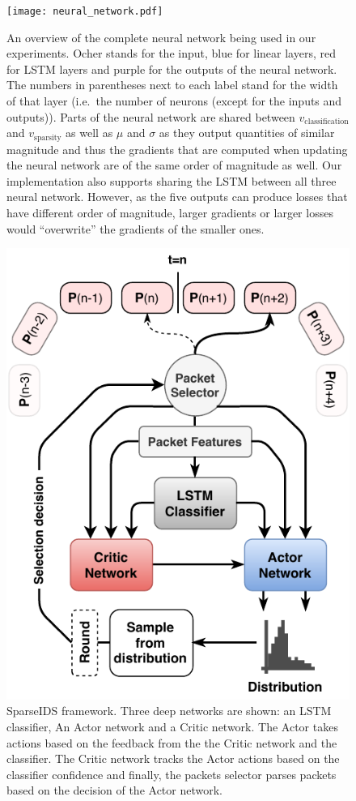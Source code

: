 \documentclass[conference]{IEEEtran}
\newcommand\note[2]{{\color{#1}#2}}
\begin{document}
\begin{figure}
\centering
  \texttt{[image: neural\_network.pdf]}
  \caption{An overview of the complete neural network being used in our experiments. Ocher stands for the input, blue for linear layers, red for LSTM layers and purple for the outputs of the neural network. The numbers in parentheses next to each label stand for the width of that layer (i.e.~the number of neurons (except for the inputs and outputs)). Parts of the neural network are shared between $v_\text{classification}$ and $v_\text{sparsity}$ as well as $\mu$ and $\sigma$ as they output quantities of similar magnitude and thus the gradients that are computed when updating the neural network are of the same order of magnitude as well. Our implementation also supports sharing the LSTM between all three neural network. However, as the five outputs can produce losses that have different order of magnitude, larger gradients or larger losses would ``overwrite'' the gradients of the smaller ones.}
  \label{fig:neuralNetworkArchitecture}
\end{figure}


\begin{figure}
\centering
  \includegraphics[width=0.8\columnwidth]{img/rnn-sampling.pdf}
  \caption{SparseIDS framework. Three deep networks are shown: an LSTM classifier, An Actor network and a Critic network. The Actor takes actions based on the feedback from the the Critic network and the classifier. The Critic network tracks the Actor actions based on the classifier confidence and finally, the packets selector parses packets based on the decision of the Actor network.}
  \label{fig:sampling}
\end{figure}
\end{document}
